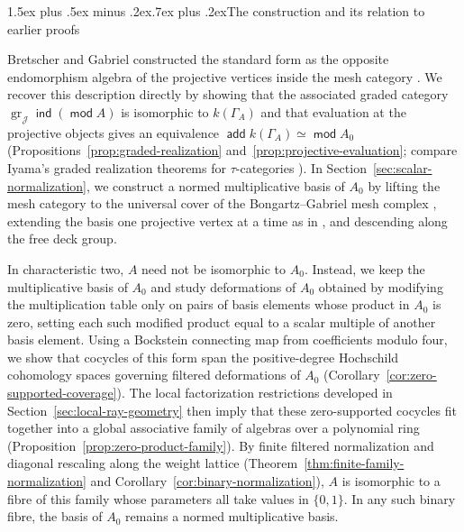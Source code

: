 \documentclass[a4paper,reqno,11pt]{amsart}
\makeatletter
\renewcommand{\subsection}{\@startsection{subsection}{2}%
  {\z@}{1.5ex plus .5ex minus .2ex}{.7ex plus .2ex}{\normalfont\bfseries}}
\theoremstyle{definition}
\DeclareMathOperator{\modu}{\mathsf{mod}}
\DeclareMathOperator{\ind}{\mathsf{ind}}
\DeclareMathOperator{\add}{\mathsf{add}}
\DeclareMathOperator{\gr}{gr}
\newcommand{\JJ}{\mathcal J}
\makeatother
\begin{document}
\subsection{The construction and its relation to earlier proofs}
\label{subsec:intro-comparison}

Bretscher and Gabriel constructed the standard form as the opposite
endomorphism algebra of the projective vertices inside the mesh category
\cite[Section~3.1]{BretscherGabriel}. We recover this description directly
by showing that the associated graded category $\gr_\JJ\ind(\modu A)$ is
isomorphic to $k(\Gamma_A)$ and that evaluation at the projective objects
gives an equivalence $\add k(\Gamma_A)\simeq\modu A_0$
(Propositions~\ref{prop:graded-realization}
and~\ref{prop:projective-evaluation}; compare Iyama's graded realization
theorems for $\tau$-categories \cite[Theorems~5.2 and~9.2]{IyamaI}). In
Section~\ref{sec:scalar-normalization}, we construct a normed multiplicative
basis of $A_0$ by lifting the mesh category to the universal cover of the
Bongartz--Gabriel mesh complex \cite[Section~4]{BongartzGabriel}, extending
the basis one projective vertex at a time as in
\cite[Section~2.6]{BretscherGabriel}, and descending along the free deck
group.

In characteristic two, $A$ need not be isomorphic to $A_0$. Instead, we keep
the multiplicative basis of $A_0$ and study deformations of $A_0$ obtained
by modifying the multiplication table only on pairs of basis elements whose
product in $A_0$ is zero, setting each such modified product equal to a
scalar multiple of another basis element. Using a Bockstein connecting map
from coefficients modulo four, we show that cocycles of this form span the
positive-degree Hochschild cohomology spaces governing filtered deformations
of $A_0$ (Corollary~\ref{cor:zero-supported-coverage}). The local
factorization restrictions developed in
Section~\ref{sec:local-ray-geometry} then imply that these zero-supported
cocycles fit together into a global associative family of algebras over a
polynomial ring (Proposition~\ref{prop:zero-product-family}). By finite
filtered normalization and diagonal rescaling along the weight lattice
(Theorem~\ref{thm:finite-family-normalization} and
Corollary~\ref{cor:binary-normalization}), $A$ is isomorphic to a fibre of
this family whose parameters all take values in $\{0,1\}$. In any such
binary fibre, the basis of $A_0$ remains a normed multiplicative basis.
\end{document}
